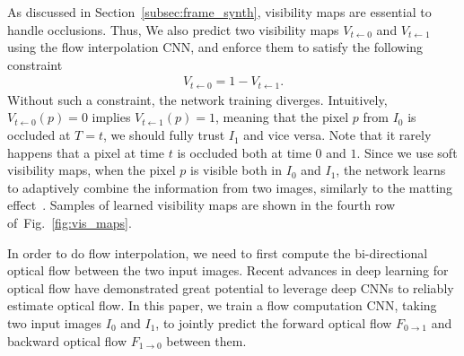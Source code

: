 \documentclass[10pt,twocolumn,letterpaper]{article}
\newcommand{\figref}[1]{Fig.~\ref{#1}}
\begin{document}
As discussed in Section~\ref{subsec:frame_synth}, visibility maps are essential to handle occlusions. Thus, We also predict two visibility maps $V_{t\leftarrow0}$ and $V_{t\leftarrow1}$ using the flow interpolation CNN, and enforce them to satisfy the following constraint
\begin{align}
V_{t\leftarrow0} = 1 - V_{t\leftarrow1}.
\end{align}
Without such a constraint, the network training diverges. Intuitively, $V_{t\leftarrow0}(p)=0$ implies $V_{t\leftarrow1}(p)=1$, meaning that the pixel $p$ from $I_0$ is occluded at $T=t$, we should fully trust $I_1$ and vice versa. Note that it rarely happens that a pixel at time $t$ is occluded both at time $0$ and $1$. Since we use soft visibility maps, when the pixel $p$ is visible both in $I_0$ and $I_1$, the network learns to adaptively combine the information from two images, similarly to the matting effect~\cite{Rhemann09A}. Samples of learned visibility maps are shown in the fourth row of~\figref{fig:vis_maps}.


In order to do flow interpolation, we need to first compute the bi-directional optical flow between the two input images. Recent advances in deep learning for optical flow have demonstrated great potential to leverage deep CNNs to reliably estimate optical flow. In this paper, we train a flow computation CNN, taking two input images $I_0$ and $I_1$, to jointly predict the forward optical flow $F_{0\rightarrow1}$ and backward optical flow $F_{1\rightarrow0}$ between them.
\end{document}
